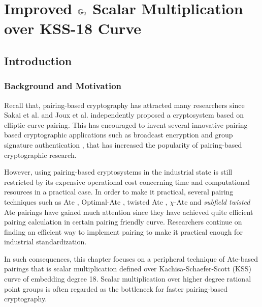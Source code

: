 \chapter{Improved \texorpdfstring{${\mathbb{G}}_{2}$}{G2} Scalar Multiplication over KSS-18 Curve} 
\label{Chapter_IEICE}
\section{Introduction}
\subsection{Background and Motivation}
Recall that, pairing-based cryptography has attracted many researchers since Sakai et al. \cite{EPRINT:SakKas03} and Joux et al. \cite{JC:Joux04} independently proposed a cryptosystem based on elliptic curve pairing. This has encouraged to invent several innovative pairing-based cryptographic applications such as broadcast encryption \cite{C:BonGenWat05} and group signature authentication \cite{C:BonBoySha04}, that has increased the popularity of pairing-based cryptographic research.

However, using pairing-based cryptosystems in the industrial state is still restricted by its expensive operational cost concerning time and computational resources in a practical case. 
In order to make it practical, several pairing techniques such as Ate \cite{DBLP:reference/crc/2005ehcc}, Optimal-Ate \cite{DBLP:journals/tit/Vercauteren10}, twisted Ate \cite{EPRINT:MKHO07}, $\chi$-Ate \cite{PAIRING:NASKM08} and \textit{subfield twisted} Ate \cite{PAIRING:DevScoDah07} pairings have gained much attention since they have achieved quite efficient pairing calculation in certain pairing friendly curve. 
Researchers continue on finding an efficient way to implement pairing to make it practical enough for industrial standardization. 

In such consequences, this chapter focuses on a peripheral technique of Ate-based pairings that is scalar multiplication defined over Kachisa-Schaefer-Scott (KSS) curve \cite{EPRINT:KacSchSco07} of embedding degree 18. 
Scalar multiplication over higher degree rational point groups is often regarded as the bottleneck for faster pairing-based cryptography.

